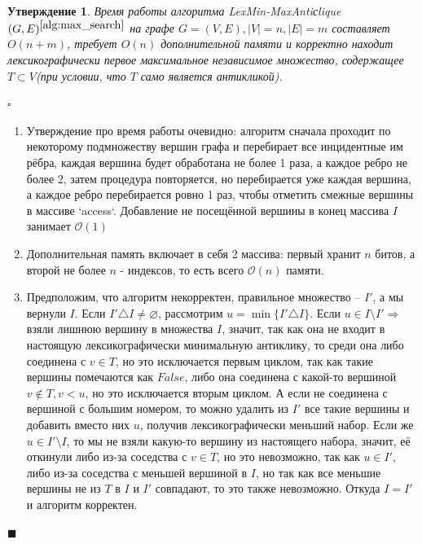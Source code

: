\documentclass{article}
\newtheorem{sentense}{Утверждение}
\begin{document}
\begin{sentense}
\label{sentense:clique}
Время работы алгоритма \textit{LexMin-MaxAntiсlique}$(G, E)^{\ref{alg:max_search}}$ на графе $G=(V, E), |V|=n, |E|=m$ составляет $O(n + m)$,
требует $O(n)$ дополнительной памяти и корректно находит лексикографически первое максимальное независимое множество, содержащее $T\subset V$(при условии, что
$T$ само является антикликой).
\end{sentense}
\noindent $\square$
\begin{enumerate}
\item Утверждение про время работы очевидно: алгоритм сначала проходит по некоторому подмножеству вершин графа и перебирает все инцидентные им рёбра,
каждая вершина будет обработана не более 1 раза, а каждое ребро не более 2, затем процедура повторяется, но перебирается уже каждая вершина, а каждое ребро
перебирается ровно 1 раз, чтобы отметить смежные вершины в массиве `access`. Добавление не посещённой вершины в конец массива $I$ занимает $\mathcal{O}(1)$
\item Дополнительная память включает в себя 2 массива: первый хранит $n$ битов, а второй не более $n$ - индексов, то есть всего $\mathcal{O}(n)$ памяти.
\item Предположим, что алгоритм некорректен, правильное множество -- $I'$, а мы вернули $I$. Если $I'\triangle I\not=\varnothing$,
рассмотрим $u = \min\{I'\triangle I\}$. Если $u \in I\setminus I' \Rightarrow$ взяли лишнюю вершину в множества $I$, значит, так как она не входит
в настоящую лексикографически минимальную антиклику, то среди она либо соединена с $v\in T$, но это исключается первым циклом, так как такие вершины
помечаются как $False$, либо она соединена с какой-то вершиной $v\not\in T, v<u$, но это исключается вторым циклом. А если не соединена с вершиной с
большим номером, то можно удалить из $I'$ все такие вершины и добавить вместо них $u$, получив лексикографически меньший набор. Если же $u\in I'\setminus I$, то
мы не взяли какую-то вершину из настоящего набора, значит, её откинули либо из-за соседства с $v\in T$, но это невозможно, так как $u\in I'$, либо
из-за соседства с меньшей вершиной в $I$, но так как все меньшие вершины не из $T$ в $I$ и $I'$ совпадают, то это также невозможно. Откуда $I=I'$ и алгоритм
корректен.

\end{enumerate}
\begin{flushright} $\blacksquare$ \end{flushright}
\end{document}
